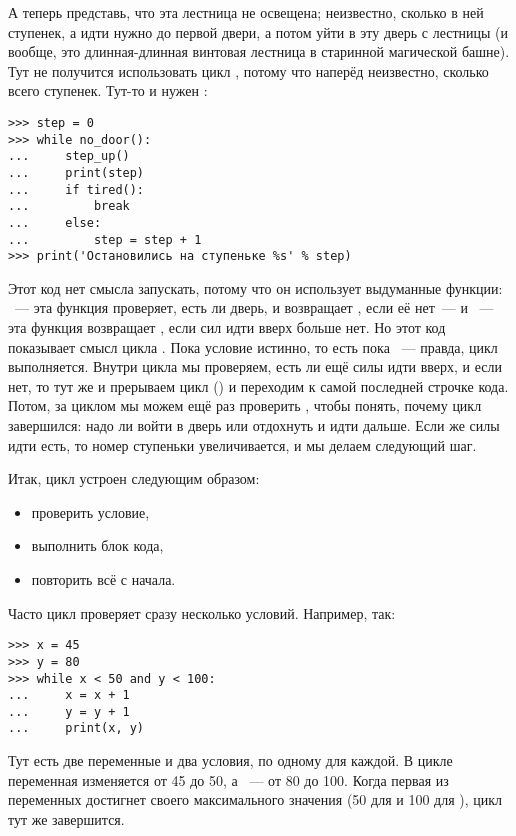 А теперь представь, что эта лестница не освещена; неизвестно, сколько в ней ступенек, а идти нужно до первой двери, а потом уйти в эту дверь с лестницы (и вообще, это длинная-длинная винтовая лестница в старинной магической башне). Тут не получится использовать цикл , потому что наперёд неизвестно, сколько всего ступенек. Тут-то и нужен :

\begin{verbatim}
>>> step = 0
>>> while no_door():
...     step_up()
...     print(step)
...     if tired():
...         break
...     else:
...         step = step + 1
>>> print('Остановились на ступеньке %s' % step)
\end{verbatim}

Этот код нет смысла запускать, потому что он использует выдуманные функции: ~— эта функция проверяет, есть ли дверь, и возвращает , если её нет — и  — эта функция возвращает , если сил идти вверх больше нет. Но этот код показывает смысл цикла . Пока условие истинно, то есть пока  — правда, цикл выполняется. Внутри цикла мы проверяем, есть ли ещё силы идти вверх, и если нет, то тут же и прерываем цикл () и переходим к самой последней строчке кода. Потом, за циклом мы можем ещё раз проверить , чтобы понять, почему цикл завершился: надо ли войти в дверь или отдохнуть и идти дальше. Если же силы идти есть, то номер ступеньки увеличивается, и мы делаем следующий шаг.

Итак, цикл  устроен следующим образом:

{\renewcommand{\labelitemi}{$\triangleright$}
\begin{itemize}
\item проверить условие,
\item выполнить блок кода,
\item повторить всё с начала.
\end{itemize}}

Часто цикл  проверяет сразу несколько условий. Например, так:

\begin{listing}
\begin{verbatim}
>>> x = 45
>>> y = 80
>>> while x < 50 and y < 100:
...     x = x + 1
...     y = y + 1
...     print(x, y)
\end{verbatim}
\end{listing}

Тут есть две переменные и два условия, по одному для каждой. В цикле переменная  изменяется от 45 до 50, а  — от 80 до 100. Когда первая из переменных достигнет своего максимального значения (50 для  и 100 для ), цикл тут же завершится.

